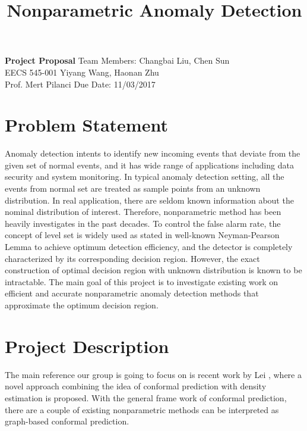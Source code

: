 \documentclass[a4paper, 11pt]{article}
\title{Nonparametric Anomaly Detection}
\author{}
\date{\vspace{-10ex}}
\begin{document}
\maketitle
\noindent
\large\textbf{Project Proposal} \hfill Team Members: Changbai Liu, Chen Sun \\
\normalsize EECS 545-001 \hfill  Yiyang Wang, Haonan Zhu \\
Prof. Mert Pilanci \hfill Due Date: 11/03/2017

\section*{Problem Statement}
Anomaly detection intents to identify new incoming events that deviate from the given set of normal events, and it has wide range of applications including data security and system monitoring. In typical anomaly detection setting, all the events from normal set are treated as sample points from an unknown distribution. In real application, there are seldom known information about the nominal distribution of interest. Therefore, nonparametric method has been heavily investigates in the past decades. To control the false alarm rate, the concept of level set is widely used as stated in well-known Neyman-Pearson Lemma to achieve optimum detection efficiency, and the detector is completely characterized by its corresponding decision region. However, the exact construction of optimal decision region with unknown distribution is known to be intractable. The main goal of this project is to investigate existing work on efficient and accurate nonparametric anomaly detection methods that approximate the optimum decision region.



\section*{Project Description}
The main reference our group is going to focus on is recent work by Lei \cite{Lei (2013)}, where a novel approach combining the idea of conformal prediction \cite{Vovk (2005)} with density estimation is proposed. With the general frame work of conformal prediction, there are a couple of existing nonparametric methods \cite{Sricharan and Hero (2011)}\cite{Zhao and Saligrama (2009)} can be interpreted as graph-based conformal prediction. \\
\end{document}
